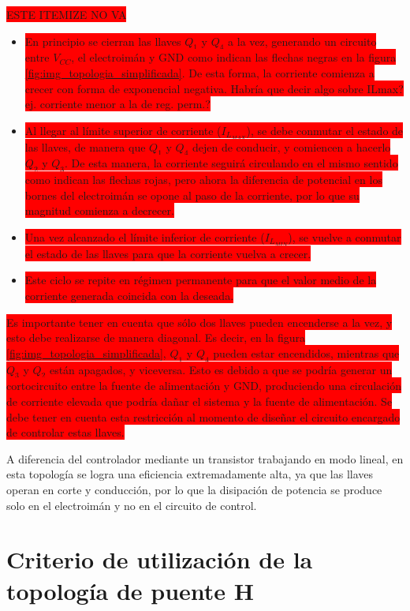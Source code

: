 \colorbox{red}{ESTE ITEMIZE NO VA}
\begin{itemize}
	\item \colorbox{red}{En principio se cierran las llaves $Q_1$ y $Q_4$ a la vez, generando un circuito entre $V_{CC}$, el electroimán y GND como indican las flechas negras en la figura \ref{fig:img_topologia_simplificada}. De esta forma, la corriente comienza a crecer con forma de exponencial negativa. }
	\colorbox{red}{Habría que decir algo sobre ILmax? ej. corriente menor a la de reg. perm.?}
	\item \colorbox{red}{Al llegar al límite superior de corriente ($I_{L_{MAX}}$), se debe conmutar el estado de las llaves, de manera que $Q_1$ y $Q_4$ dejen de conducir, y comiencen a hacerlo $Q_2$ y $Q_3$. De esta manera, la corriente seguirá circulando en el mismo sentido como indican las flechas rojas, pero ahora la diferencia de potencial en los bornes del electroimán se opone al paso de la corriente, por lo que su magnitud comienza a decrecer.}
	\item \colorbox{red}{Una vez alcanzado el límite inferior de corriente ($I_{L_{MIN}}$), se vuelve a conmutar el estado de las llaves para que la corriente vuelva a crecer.}
	\item \colorbox{red}{Este ciclo se repite en régimen permanente para que el valor medio de la corriente generada coincida con la deseada. }
\end{itemize}
\colorbox{red}{
	Es importante tener en cuenta que sólo dos llaves pueden encenderse a la vez, y esto debe realizarse de manera diagonal. Es decir, en la figura \ref{fig:img_topologia_simplificada}, $Q_1$ y $Q_4$ pueden estar encendidos, mientras que $Q_3$ y $Q_2$ están apagados, y viceversa. Esto es debido a que se podría generar un cortocircuito entre la fuente de alimentación y GND, produciendo una circulación de corriente elevada que podría dañar el sistema y la fuente de alimentación. Se debe tener en cuenta esta restricción al momento de diseñar el circuito encargado de controlar estas llaves.
}

A diferencia del controlador mediante un transistor trabajando en modo lineal, en esta topología se logra una eficiencia extremadamente alta, ya que las llaves operan en corte y conducción, por lo que la disipación de potencia se produce solo en el electroimán y no en el circuito de control.

\section{Criterio de utilización de la topología de puente H}
\label{secc_justificación-puente-H}


